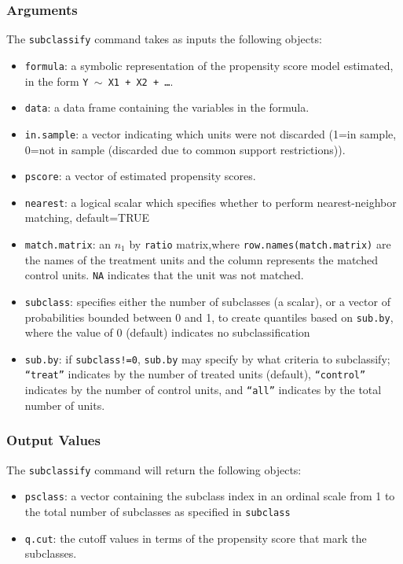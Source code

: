 \documentclass[oneside,letterpaper,titlepage]{article}
\begin{document}
\begin{appendix}
\subsubsection{Arguments}
The \texttt{subclassify} command takes as inputs the following
objects:
\begin{itemize}
\item \texttt{formula}: a symbolic representation of the propensity score
  model estimated, in the form {\tt Y $\sim$ X1 + X2 + \dots}.
\item \texttt{data}: a data frame containing the variables in the formula.
\item \texttt{in.sample}: a vector indicating which units were not discarded
  (1=in sample, 0=not in sample (discarded due to common support
  restrictions)).
\item \texttt{pscore}: a vector of estimated propensity scores.  
\item \texttt{nearest}: a logical scalar which specifies whether
  to perform nearest-neighbor matching, default=TRUE 
\item \texttt{match.matrix}: an $n_1$ by \texttt{ratio} matrix,where
  \texttt{row.names(match.matrix)} are the names of the
  treatment units and the column represents the matched control units.
  \texttt{NA} indicates that the unit was not matched.
\item \texttt{subclass}: specifies either the number of subclasses (a
  scalar), or a vector of probabilities bounded between 0 and 1, to
  create quantiles based on \texttt{sub.by}, where the value of 0
  (default) indicates no subclassification
\item \texttt{sub.by}: if \texttt{subclass!=0}, \texttt{sub.by} may specify by
  what criteria to subclassify; {\tt ``treat''} indicates by the
  number of treated units (default), {\tt ``control''} indicates by
  the number of control units, and {\tt ``all''} indicates by the
  total number of units.
\end{itemize}

\subsubsection{Output Values}
The \texttt{subclassify} command will return the following objects: 
\begin{itemize}
\item \texttt{psclass}: a vector containing the subclass index in an ordinal scale
  from 1 to the total number of subclasses as specified in
  \texttt{subclass} 
\item \texttt{q.cut}: the cutoff values in terms of the propensity score that
  mark the subclasses.
\end{itemize}


\end{appendix}
\end{document}
